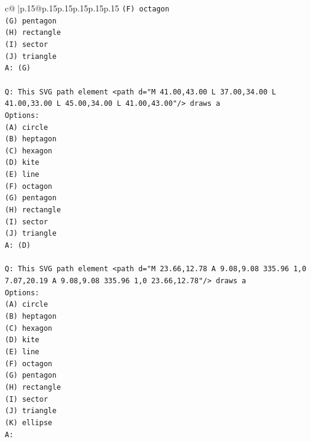 \documentclass{article}
\begin{document}
{\begin{supertabular}{c@{$\;$}|p{.15\linewidth}@{}p{.15\linewidth}p{.15\linewidth}p{.15\linewidth}p{.15\linewidth}p{.15\linewidth}}
{{{\texttt{(F) octagon} \\
\texttt{(G) pentagon} \\
\texttt{(H) rectangle} \\
\texttt{(I) sector} \\
\texttt{(J) triangle} \\
\texttt{A: (G)} \\
\\ 
\texttt{Q: This SVG path element <path d="M 41.00,43.00 L 37.00,34.00 L 41.00,33.00 L 45.00,34.00 L 41.00,43.00"/> draws a} \\
\texttt{Options:} \\
\texttt{(A) circle} \\
\texttt{(B) heptagon} \\
\texttt{(C) hexagon} \\
\texttt{(D) kite} \\
\texttt{(E) line} \\
\texttt{(F) octagon} \\
\texttt{(G) pentagon} \\
\texttt{(H) rectangle} \\
\texttt{(I) sector} \\
\texttt{(J) triangle} \\
\texttt{A: (D)} \\
\\ 
\texttt{Q: This SVG path element <path d="M 23.66,12.78 A 9.08,9.08 335.96 1,0 7.07,20.19 A 9.08,9.08 335.96 1,0 23.66,12.78"/> draws a} \\
\texttt{Options:} \\
\texttt{(A) circle} \\
\texttt{(B) heptagon} \\
\texttt{(C) hexagon} \\
\texttt{(D) kite} \\
\texttt{(E) line} \\
\texttt{(F) octagon} \\
\texttt{(G) pentagon} \\
\texttt{(H) rectangle} \\
\texttt{(I) sector} \\
\texttt{(J) triangle} \\
\texttt{(K) ellipse} \\
\texttt{A:} \\
            }
        }
    }
     \\ \\


\end{supertabular}}
\end{document}
